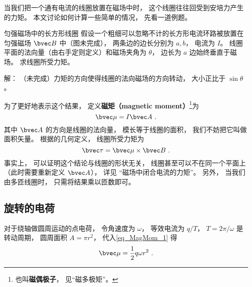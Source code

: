 
\begin{issues}
\issueTODO
\end{issues}


当我们把一个通有电流的线圈放置在磁场中时， 这个线圈往往回受到安培力产生的力矩。 本文讨论如何计算一些简单的情况， 先看一道例题。

\begin{example}{匀强磁场中的长方形线圈}
假设一个粗细可以忽略不计的长方形电流环路被放置在匀强磁场 $\bvec B$ 中（图未完成）， 两条边的边长分别为 $a, b$， 电流为 $I$。 线圈平面的法向量（由右手定则定义）和磁场夹角为 $\theta$， 边长为 $a$ 边始终垂直于磁场。 求线圈所受力矩。

解： （未完成）力矩的方向使得线圈的法向磁场的方向转动， 大小正比于 $\sin\theta$。
\end{example}

为了更好地表示这个结果， 定义\textbf{磁矩（magnetic moment）}\footnote{也叫\textbf{磁偶极子}， 见“磁多极矩”。}为
\begin{equation}\label{eq_MagMom_1}
\bvec \mu = I \bvec A~.
\end{equation}
其中 $\bvec A$ 的方向是线圈的法向量， 模长等于线圈的面积， 我们不妨把它叫做面积矢量。 根据的几何定义， 线圈所受力矩为
\begin{equation}\label{eq_MagMom_2}
\bvec \tau = \bvec \mu \times \bvec B~.
\end{equation}
事实上， 可以证明这个结论与线圈的形状无关， 线圈甚至可以不在同一个平面上（此时需要重新定义 $\bvec A$）， 详见 “磁场中闭合电流的力矩”。 另外， 当我们由多匝线圈时， 只需将结果乘以匝数即可。

\subsection{旋转的电荷}
对于绕轴做圆周运动的点电荷， 令角速度为 $\omega$， 等效电流为 $q/T$， $T = 2\pi/\omega$ 是转动周期， 圆周面积 $A = \pi r^2$， 代入\autoref{eq_MagMom_1} 得
\begin{equation}
\bvec \mu = \frac{1}{2} q\omega r^2~.
\end{equation}

